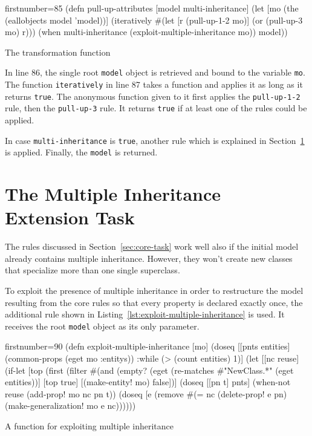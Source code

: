 \documentclass[submission]{eptcs}
\begin{document}
\begin{listing}[htbp]
  \begin{clojurecode*}{firstnumber=85}
(defn pull-up-attributes [model multi-inheritance]
  (let [mo (the (eallobjects model 'model))]
    (iteratively #(let [r (pull-up-1-2 mo)]
                    (or (pull-up-3 mo) r)))
    (when multi-inheritance (exploit-multiple-inheritance mo))
    model))
  \end{clojurecode*}
  \caption{The transformation function}
    \label{lst:pull-up-attributes}
\end{listing}

In line 86, the single root \verb|model| object is retrieved and bound to the
variable \verb|mo|.  The function \verb|iteratively| in line 87 takes a
function and applies it as long as it returns \verb|true|.  The anonymous
function given to it first applies the \verb|pull-up-1-2| rule, then the
\verb|pull-up-3| rule.  It returns \verb|true| if at least one of the rules
could be applied.

In case \verb|multi-inheritance| is \verb|true|, another rule which is
explained in Section~\ref{sec:extension-task} is applied.  Finally, the
\verb|model| is returned.



\section{The Multiple Inheritance Extension Task}
\label{sec:extension-task}

The rules discussed in Section~\ref{sec:core-task} work well also if the
initial model already contains multiple inheritance.  However, they won't
create new classes that specialize more than one single superclass.

To exploit the presence of multiple inheritance in order to restructure the
model resulting from the core rules so that every property is declared exactly
once, the additional rule shown in
Listing~\ref{lst:exploit-multiple-inheritance} is used.  It receives the root
\verb|model| object as its only parameter.

\begin{listing}[htbp]
  \begin{clojurecode*}{firstnumber=90}
(defn exploit-multiple-inheritance [mo]
  (doseq [[pnts entities] (common-props (eget mo :entitys))
          :while (> (count entities) 1)]
    (let [[nc reuse]
          (if-let [top (first (filter
                               #(and (empty? (eget %
                                     (re-matches #"NewClass.*" (eget %
                               entities))]
            [top true]
            [(make-entity! mo) false])]
      (doseq [[pn t] pnts]
        (when-not reuse
          (add-prop! mo nc pn t))
        (doseq [e (remove #(= nc %
          (delete-prop! e pn)
          (make-generalization! mo e nc))))))
  \end{clojurecode*}
  \caption{A function for exploiting multiple inheritance}
    \label{lst:exploit-multiple-inheritance}
\end{listing}
\end{document}

